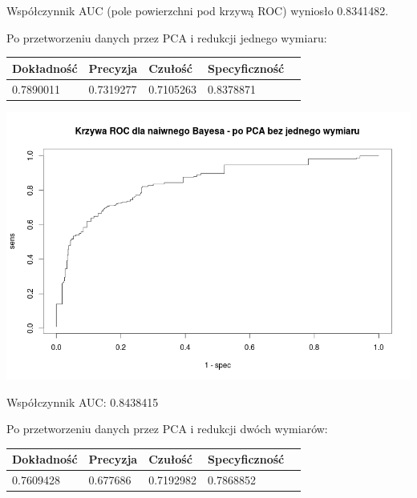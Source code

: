 \documentclass{article}
\begin{document}
Współczynnik AUC (pole powierzchni pod krzywą ROC) wyniosło 0.8341482.

Po przetworzeniu danych przez PCA i redukcji jednego wymiaru:

\begin{center}
    \begin{tabular}{| l | l | l | l | l|}
    \hline
        Dokładność &  Precyzja &  Czułość & Specyficzność \\ \hline
      	0.7890011 & 0.7319277 & 0.7105263 & 0.8378871  \\
    \hline
    \end{tabular}
\end{center}

\begin{center}
	\includegraphics[scale=0.40]{images/bayes1.png}
\end{center}

Współczynnik AUC: 0.8438415

Po przetworzeniu danych przez PCA i redukcji dwóch wymiarów:

\begin{center}
    \begin{tabular}{| l | l | l | l | l|}
    \hline
        Dokładność &  Precyzja &  Czułość & Specyficzność \\ \hline
      	0.7609428 & 0.677686 & 0.7192982 & 0.7868852  \\
    \hline
    \end{tabular}
\end{center}
\end{document}
